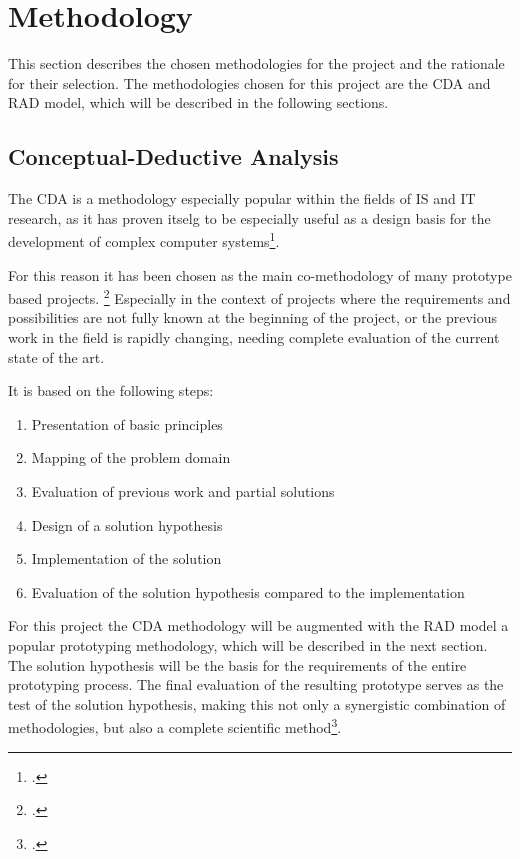 \chapter{Methodology}
\label{methodology}

This section describes the chosen methodologies for the project and the rationale for their selection.
The methodologies chosen for this project are the \ac{CDA} and \ac{RAD} model, which will be described in the following sections.

\section{Conceptual-Deductive Analysis}

The \ac{CDA} is a methodology especially popular within the fields of \ac{IS} and \ac{IT} research,
as it has proven itselg to be especially useful as a design basis for the development of complex computer systems\footcite{wildeMethodenspektrumWirtschaftsinformatikUeberblick}.

For this reason it has been chosen as the main co-methodology of many prototype based projects. \footcite{schreinerGestaltungsorientierterKernOder}
Especially in the context of projects where the requirements and possibilities are not fully known at the beginning of the project,
or the previous work in the field is rapidly changing, needing complete evaluation of the current state of the art.

It is based on the following steps:

\begin{enumerate}
    \item Presentation of basic principles
    \item Mapping of the problem domain
    \item Evaluation of previous work and partial solutions
    \item Design of a solution hypothesis
    \item Implementation of the solution
    \item Evaluation of the solution hypothesis compared to the implementation
\end{enumerate}

For this project the \ac{CDA} methodology will be augmented with the \ac{RAD} model a popular prototyping methodology, which will be described in the next section.
The solution hypothesis will be the basis for the requirements of the entire prototyping process.
The final evaluation of the resulting prototype serves as the test of the solution hypothesis,
making this not only a synergistic combination of methodologies, but also a complete scientific method\footcite{wildeMethodenspektrumWirtschaftsinformatikUeberblick}.


